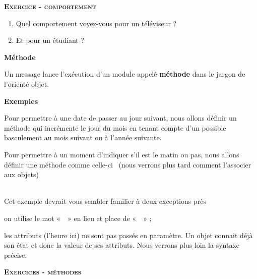 {\sffamily\bfseries\scshape
Exercice - comportement}

\begin{enumerate}
	\item {
		Quel comportement voyez-vous pour un téléviseur ?}
	\item {
		Et pour un étudiant ?}
\end{enumerate}

\bigskip

{\sffamily\bfseries\upshape
Méthode}

{Un message lance l'exécution d'un
module appelé \textbf{méthode} dans le jargon de
l'orienté objet. }

{\bfseries
Exemples}

\begin{liste}
	\item {
		Pour permettre à une date de passer au jour suivant, nous allons définir
		un méthode qui incrémente le jour du mois en tenant compte
		d'un possible basculement au mois suivant ou à
		l'année suivante.}
	\item {
		Pour permettre à un moment d'indiquer
		s'il est le matin ou pas, nous allons définir une
		méthode comme celle-ci \ (nous verrons plus tard comment
		l'associer aux objets)}

		\bigskip

		\\
		\bigskip
		{
		Cet exemple devrait vous sembler familier à deux exceptions près}

		\liststyleListv
		\begin{liste}
			\item {
				on utilise le mot «~~» en lieu et place de
				«~~» ;}
			\item {
				les attributs (l'heure ici) ne sont pas passés en
				paramètre. Un objet connait déjà son état et donc la valeur de ses
				attributs. Nous verrons plus loin la syntaxe précise.}
	\end{liste}
\end{liste}

{\sffamily\bfseries\scshape
Exercices - méthodes}

